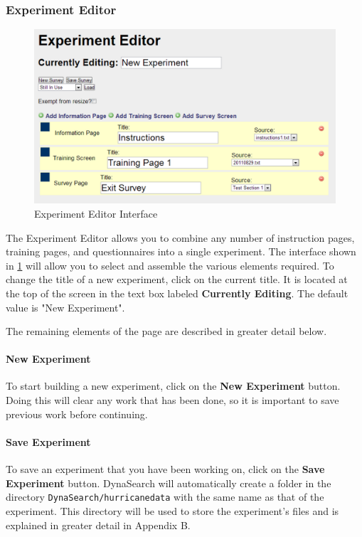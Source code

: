 \documentclass[article]{ij4uq}              %
\begin{document}
\subsubsection{Experiment Editor}

\begin{figure}[h!]
 \centering
 \includegraphics[width=5.0in]{figures/experiment_editor.png}
 \caption{Experiment Editor Interface}
 \label{fig:eeInterface}
\end{figure}
\FloatBarrier

The Experiment Editor allows you to combine any number of instruction pages, training pages, and questionnaires into a single experiment. The interface shown in \ref{fig:eeInterface} will allow you to select and assemble the various elements required. To change the title of a new experiment, click on the current title. It is located at the top of the screen in the text box labeled \textbf{Currently Editing}.  The default value is "New Experiment".

The remaining elements of the page are described in greater detail below.

\paragraph{New Experiment}
To start building a new experiment, click on the \textbf{New Experiment} button. Doing this will clear any work that has been done, so it is important to save previous work before continuing.

\paragraph{Save Experiment}
To save an experiment that you have been working on, click on the \textbf{Save Experiment} button. DynaSearch will automatically create a folder in the directory \texttt{DynaSearch/hurricane\textunderscore data} with the same name as that of the experiment.  This directory will be used to store the experiment's files and is explained in greater detail in Appendix B.
\end{document}
